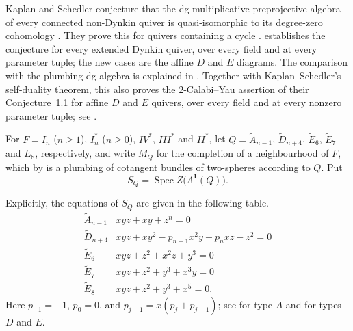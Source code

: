 \documentclass[a4paper]{amsart}
\numberwithin{equation}{section}
\begin{document}
\begin{remark}\label{rem:ks-conjectures}
Kaplan and Schedler conjecture that the dg multiplicative preprojective
algebra of every connected non-Dynkin quiver is quasi-isomorphic to its
degree-zero cohomology \cite[Conjecture~1.3]{KS}. They prove this for
quivers containing a cycle \cite[Theorem~3.7 and Proposition~4.4]{KS}.
 establishes the conjecture for every extended
Dynkin quiver, over every field and at every parameter tuple; the new
cases are the affine $D$ and $E$ diagrams. The comparison with the
plumbing dg algebra is explained in .
Together with Kaplan--Schedler's self-duality theorem, this also
proves the $2$-Calabi--Yau assertion of their Conjecture~1.1
\cite{KS} for affine $D$ and $E$ quivers, over every
field and at every nonzero parameter tuple; see .
\end{remark}

For $F=I_n$ ($n\ge1$), $I_n^*$ ($n\ge0$), $IV^*$, $III^*$ and $II^*$, let
$Q=\widetilde{A}_{n-1}$, $\widetilde D_{n+4}$, $\widetilde E_6$, $\widetilde E_7$ and $\widetilde E_8$,
respectively, and write $M_Q$ for the completion of a neighbourhood of
$F$, which by  is a plumbing of cotangent
bundles of two-spheres according to $Q$. Put
\[
 S_Q=\operatorname{Spec}Z\bigl(\Lambda^{\boldsymbol1}(Q)\bigr).
\]

Explicitly, the equations of $S_Q$ are given in the following table.
\[
\begin{array}{c|l}
 \widetilde A_{n-1}&xyz+xy+z^n=0\\
 \widetilde D_{n+4}&xyz+xy^2-p_{n-1}x^2y+p_nxz-z^2=0\\
 \widetilde E_6&xyz+z^2+x^2z+y^3=0\\
 \widetilde E_7&xyz+z^2+y^3+x^3y=0\\
 \widetilde E_8&xyz+z^2+y^3+x^5=0.
\end{array}
\]
Here $p_{-1}=-1$, $p_0=0$, and $p_{j+1}=x(p_j+p_{j-1})$;
see \cite[Corollary~6.7]{KS} for type $A$ and
 for types $D$ and $E$.
\end{document}
